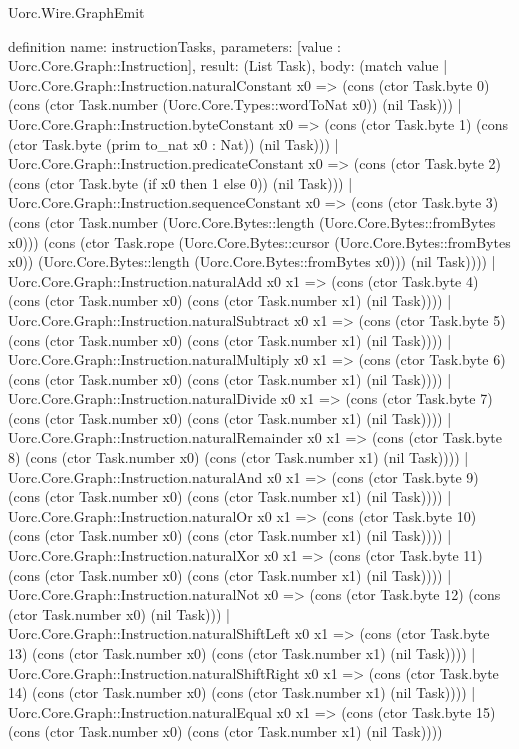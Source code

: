\begin{lexlean}{Uorc.Wire.GraphEmit}
\begin{semanticmodule}
definition{
  name: instructionTasks,
  parameters: [value : Uorc.Core.Graph::Instruction],
  result: (List Task),
  body: (match value
    | Uorc.Core.Graph::Instruction.naturalConstant x0 => (cons (ctor Task.byte 0) (cons (ctor Task.number (Uorc.Core.Types::wordToNat x0)) (nil Task)))
    | Uorc.Core.Graph::Instruction.byteConstant x0 => (cons (ctor Task.byte 1) (cons (ctor Task.byte (prim to_nat x0 : Nat)) (nil Task)))
    | Uorc.Core.Graph::Instruction.predicateConstant x0 => (cons (ctor Task.byte 2) (cons (ctor Task.byte (if x0 then 1 else 0)) (nil Task)))
    | Uorc.Core.Graph::Instruction.sequenceConstant x0 => (cons (ctor Task.byte 3) (cons (ctor Task.number (Uorc.Core.Bytes::length (Uorc.Core.Bytes::fromBytes x0))) (cons (ctor Task.rope (Uorc.Core.Bytes::cursor (Uorc.Core.Bytes::fromBytes x0)) (Uorc.Core.Bytes::length (Uorc.Core.Bytes::fromBytes x0))) (nil Task))))
    | Uorc.Core.Graph::Instruction.naturalAdd x0 x1 => (cons (ctor Task.byte 4) (cons (ctor Task.number x0) (cons (ctor Task.number x1) (nil Task))))
    | Uorc.Core.Graph::Instruction.naturalSubtract x0 x1 => (cons (ctor Task.byte 5) (cons (ctor Task.number x0) (cons (ctor Task.number x1) (nil Task))))
    | Uorc.Core.Graph::Instruction.naturalMultiply x0 x1 => (cons (ctor Task.byte 6) (cons (ctor Task.number x0) (cons (ctor Task.number x1) (nil Task))))
    | Uorc.Core.Graph::Instruction.naturalDivide x0 x1 => (cons (ctor Task.byte 7) (cons (ctor Task.number x0) (cons (ctor Task.number x1) (nil Task))))
    | Uorc.Core.Graph::Instruction.naturalRemainder x0 x1 => (cons (ctor Task.byte 8) (cons (ctor Task.number x0) (cons (ctor Task.number x1) (nil Task))))
    | Uorc.Core.Graph::Instruction.naturalAnd x0 x1 => (cons (ctor Task.byte 9) (cons (ctor Task.number x0) (cons (ctor Task.number x1) (nil Task))))
    | Uorc.Core.Graph::Instruction.naturalOr x0 x1 => (cons (ctor Task.byte 10) (cons (ctor Task.number x0) (cons (ctor Task.number x1) (nil Task))))
    | Uorc.Core.Graph::Instruction.naturalXor x0 x1 => (cons (ctor Task.byte 11) (cons (ctor Task.number x0) (cons (ctor Task.number x1) (nil Task))))
    | Uorc.Core.Graph::Instruction.naturalNot x0 => (cons (ctor Task.byte 12) (cons (ctor Task.number x0) (nil Task)))
    | Uorc.Core.Graph::Instruction.naturalShiftLeft x0 x1 => (cons (ctor Task.byte 13) (cons (ctor Task.number x0) (cons (ctor Task.number x1) (nil Task))))
    | Uorc.Core.Graph::Instruction.naturalShiftRight x0 x1 => (cons (ctor Task.byte 14) (cons (ctor Task.number x0) (cons (ctor Task.number x1) (nil Task))))
    | Uorc.Core.Graph::Instruction.naturalEqual x0 x1 => (cons (ctor Task.byte 15) (cons (ctor Task.number x0) (cons (ctor Task.number x1) (nil Task))))
}
\end{semanticmodule}
\end{lexlean}

